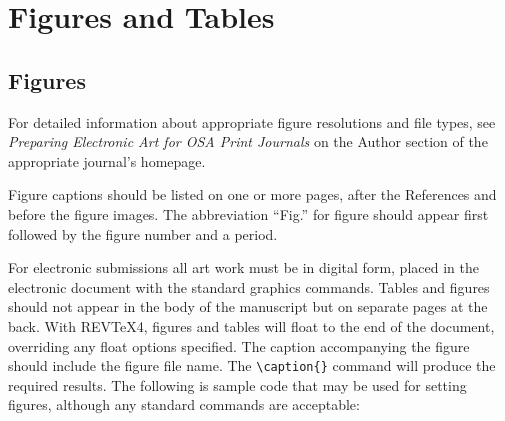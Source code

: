 \documentclass[letterpaper,11pt]{article}   %
\begin{document}



\section{Figures and Tables}

\subsection{Figures}
For detailed information about appropriate figure resolutions and
file types, see {\em Preparing Electronic Art for OSA Print
Journals} on the Author section of the appropriate journal's
homepage.

Figure captions should be listed on one or more pages, after the
References and before the figure images. The abbreviation ``Fig.''
for figure should appear first followed by the figure number and a
period.

For electronic submissions all art work must be in digital form,
placed in the electronic document with the standard graphics
commands. Tables and figures should not appear in the body of the
manuscript but on separate pages at the back. With REV\TeX{}4,
figures and tables will float to the end of the document,
overriding any float options specified.  The caption accompanying
the figure should include the figure file name. The
\verb+\caption{}+ command will produce the required results. The
following is sample code that may be used for setting figures,
although any standard commands are acceptable: 
\end{document}
